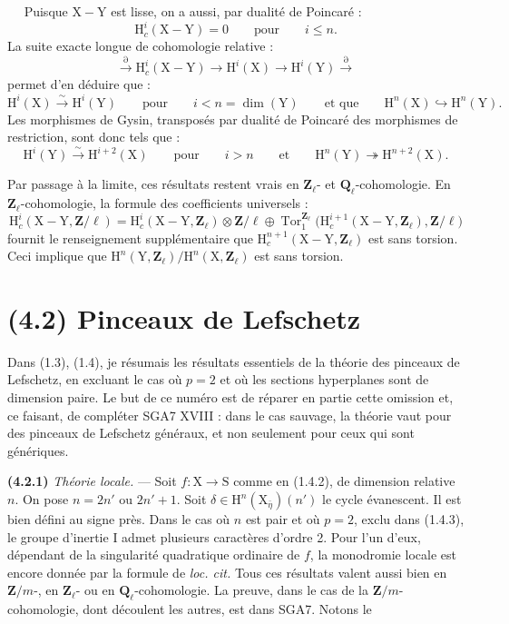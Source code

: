 \documentclass[11pt,leqno]{article}
\newcommand{\Page}[1]{\ifvmode\noindent\else\unskip\ \fi{\footnotesize\textcolor{gray}{[p.\,#1]}}\ \ignorespaces}
\begin{document}
\Page{219}
Puisque \(\mathrm{X}-\mathrm{Y}\) est lisse, on a aussi, par dualité de Poincaré :
\[
\mathrm{H}_c^i(\mathrm{X}-\mathrm{Y})=0
\qquad\text{pour}\qquad i\leq n.
\]
La suite exacte longue de cohomologie relative :
\[
\xrightarrow{\partial}\mathrm{H}_c^i(\mathrm{X}-\mathrm{Y})
\to\mathrm{H}^i(\mathrm{X})
\to\mathrm{H}^i(\mathrm{Y})\xrightarrow{\partial}
\]
permet d’en déduire que :
\[
\mathrm{H}^i(\mathrm{X})\xrightarrow{\sim}\mathrm{H}^i(\mathrm{Y})
\qquad\text{pour}\qquad i<n=\dim(\mathrm{Y})
\qquad\text{et que}\qquad
\mathrm{H}^n(\mathrm{X})\hookrightarrow\mathrm{H}^n(\mathrm{Y}).
\]
Les morphismes de Gysin, transposés par dualité de Poincaré des morphismes de restriction, sont donc tels que :
\[
\mathrm{H}^i(\mathrm{Y})\xrightarrow{\sim}\mathrm{H}^{i+2}(\mathrm{X})
\qquad\text{pour}\qquad i>n
\qquad\text{et}\qquad
\mathrm{H}^n(\mathrm{Y})\twoheadrightarrow\mathrm{H}^{n+2}(\mathrm{X}).
\]

Par passage à la limite, ces résultats restent vrais en \(\mathbf{Z}_\ell\)- et \(\mathbf{Q}_\ell\)-cohomologie. En \(\mathbf{Z}_\ell\)-cohomologie, la formule des coefficients universels :
\[
\mathrm{H}_c^i(\mathrm{X}-\mathrm{Y},\mathbf{Z}/\ell)
=
\mathrm{H}_c^i(\mathrm{X}-\mathrm{Y},\mathbf{Z}_\ell)
\otimes\mathbf{Z}/\ell
\oplus
\operatorname{Tor}_1^{\mathbf{Z}_\ell}
\bigl(\mathrm{H}_c^{i+1}(\mathrm{X}-\mathrm{Y},\mathbf{Z}_\ell),\mathbf{Z}/\ell\bigr)
\]
fournit le renseignement supplémentaire que \(\mathrm{H}_c^{n+1}(\mathrm{X}-\mathrm{Y},\mathbf{Z}_\ell)\) est sans torsion. Ceci implique que \(\mathrm{H}^n(\mathrm{Y},\mathbf{Z}_\ell)/\mathrm{H}^n(\mathrm{X},\mathbf{Z}_\ell)\) est sans torsion.

\section*{(4.2) Pinceaux de Lefschetz}

Dans (1.3), (1.4), je résumais les résultats essentiels de la théorie des pinceaux de Lefschetz, en excluant le cas où \(p=2\) et où les sections hyperplanes sont de dimension paire. Le but de ce numéro est de réparer en partie cette omission et, ce faisant, de compléter SGA7 XVIII : dans le cas sauvage, la théorie vaut pour des pinceaux de Lefschetz généraux, et non seulement pour ceux qui sont génériques.

\textbf{(4.2.1)} \textit{Théorie locale.} — Soit \(f:\mathrm{X}\to\mathrm{S}\) comme en (1.4.2), de dimension relative \(n\). On pose \(n=2n'\) ou \(2n'+1\). Soit \(\delta\in\mathrm{H}^n(\mathrm{X}_{\bar\eta})(n')\) le cycle évanescent. Il est bien défini au signe près. Dans le cas où \(n\) est pair et où \(p=2\), exclu dans (1.4.3), le groupe d’inertie \(\mathrm{I}\) admet plusieurs caractères d’ordre 2. Pour l’un d’eux, dépendant de la singularité quadratique ordinaire de \(f\), la monodromie locale est encore donnée par la formule de \textit{loc. cit.} Tous ces résultats valent aussi bien en \(\mathbf{Z}/m\)-, en \(\mathbf{Z}_\ell\)- ou en \(\mathbf{Q}_\ell\)-cohomologie. La preuve, dans le cas de la \(\mathbf{Z}/m\)-cohomologie, dont découlent les autres, est dans SGA7. Notons le
\end{document}
